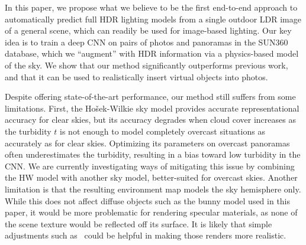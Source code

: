 
In this paper, we propose what we believe to be the first end-to-end approach to automatically predict full HDR lighting models from a single outdoor LDR image of a general scene, which can readily be used for image-based lighting. Our key idea is to train a deep CNN on pairs of photos and panoramas in the SUN360 database, which we ``augment'' with HDR information via a physics-based model of the sky. We show that our method significantly outperforms previous work, and that it can be used to realistically insert virtual objects into photos.

Despite offering state-of-the-art performance, our method still suffers from some limitations. First, the Ho\v{s}ek-Wilkie sky model provides accurate representational accuracy for clear skies, but its accuracy degrades when cloud cover increases as the turbidity $t$ is not enough to model completely overcast situations as accurately as for clear skies. Optimizing its parameters on overcast panoramas often underestimates the turbidity, resulting in a bias toward low turbidity in the CNN. We are currently investigating ways of mitigating this issue by combining the HW model with another sky model, better-suited for overcast skies. Another limitation is that the resulting environment map models the sky hemisphere only. While this does not affect diffuse objects such as the bunny model used in this paper, it would be more problematic for rendering specular materials, as none of the scene texture would be reflected off its surface. It is likely that simple adjustments such as~\cite{khan-siggraph-06} could be helpful in making those renders more realistic. 

